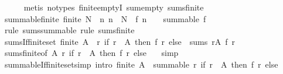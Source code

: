 \begin{isabellebody}
%
\isadelimproof
\ \ \ \ %
\endisadelimproof
%
\isatagproof
{}\isamarkupfalse%
\ {\isacharparenleft}{\kern0pt}metis\ {\isacharparenleft}{\kern0pt}no{\isacharunderscore}{\kern0pt}types{\isacharparenright}{\kern0pt}\ finite{\isachardot}{\kern0pt}emptyI\ sum{\isachardot}{\kern0pt}empty\ sums{\isacharunderscore}{\kern0pt}finite{\isacharparenright}{\kern0pt}%
\endisatagproof
{\isafoldproof}%
%
\isadelimproof
\isanewline
%
\endisadelimproof
\isanewline
{}\isamarkupfalse%
\ summable{\isacharunderscore}{\kern0pt}finite{\isacharcolon}{\kern0pt}\ {\isachardoublequoteopen}finite\ N\ {\isasymLongrightarrow}\ {\isacharparenleft}{\kern0pt}{\isasymAnd}n{\isachardot}{\kern0pt}\ n\ {\isasymnotin}\ N\ {\isasymLongrightarrow}\ f\ n\ {\isacharequal}{\kern0pt}\ {}{\isacharparenright}{\kern0pt}\ {\isasymLongrightarrow}\ summable\ f{\isachardoublequoteclose}\isanewline
%
\isadelimproof
\ \ %
\endisadelimproof
%
\isatagproof
{}\isamarkupfalse%
\ {\isacharparenleft}{\kern0pt}rule\ sums{\isacharunderscore}{\kern0pt}summable{\isacharparenright}{\kern0pt}\ {\isacharparenleft}{\kern0pt}rule\ sums{\isacharunderscore}{\kern0pt}finite{\isacharparenright}{\kern0pt}%
\endisatagproof
{\isafoldproof}%
%
\isadelimproof
\isanewline
%
\endisadelimproof
\isanewline
{}\isamarkupfalse%
\ sums{\isacharunderscore}{\kern0pt}If{\isacharunderscore}{\kern0pt}finite{\isacharunderscore}{\kern0pt}set{\isacharcolon}{\kern0pt}\ {\isachardoublequoteopen}finite\ A\ {\isasymLongrightarrow}\ {\isacharparenleft}{\kern0pt}{\isasymlambda}r{\isachardot}{\kern0pt}\ if\ r\ {\isasymin}\ A\ then\ f\ r\ else\ {}{\isacharparenright}{\kern0pt}\ sums\ {\isacharparenleft}{\kern0pt}{\isasymSum}r{\isasymin}A{\isachardot}{\kern0pt}\ f\ r{\isacharparenright}{\kern0pt}{\isachardoublequoteclose}\isanewline
%
\isadelimproof
\ \ %
\endisadelimproof
%
\isatagproof
{}\isamarkupfalse%
\ sums{\isacharunderscore}{\kern0pt}finite{\isacharbrackleft}{\kern0pt}of\ A\ {\isachardoublequoteopen}{\isacharparenleft}{\kern0pt}{\isasymlambda}r{\isachardot}{\kern0pt}\ if\ r\ {\isasymin}\ A\ then\ f\ r\ else\ {}{\isacharparenright}{\kern0pt}{\isachardoublequoteclose}{\isacharbrackright}{\kern0pt}\ \isamarkupfalse%
\ simp%
\endisatagproof
{\isafoldproof}%
%
\isadelimproof
\isanewline
%
\endisadelimproof
\isanewline
{}\isamarkupfalse%
\ summable{\isacharunderscore}{\kern0pt}If{\isacharunderscore}{\kern0pt}finite{\isacharunderscore}{\kern0pt}set{\isacharbrackleft}{\kern0pt}simp{\isacharcomma}{\kern0pt}\ intro{\isacharbrackright}{\kern0pt}{\isacharcolon}{\kern0pt}\ {\isachardoublequoteopen}finite\ A\ {\isasymLongrightarrow}\ summable\ {\isacharparenleft}{\kern0pt}{\isasymlambda}r{\isachardot}{\kern0pt}\ if\ r\ {\isasymin}\ A\ then\ f\ r\ else\ {}{\isacharparenright}{\kern0pt}{\isachardoublequoteclose}\isanewline

\end{isabellebody}
